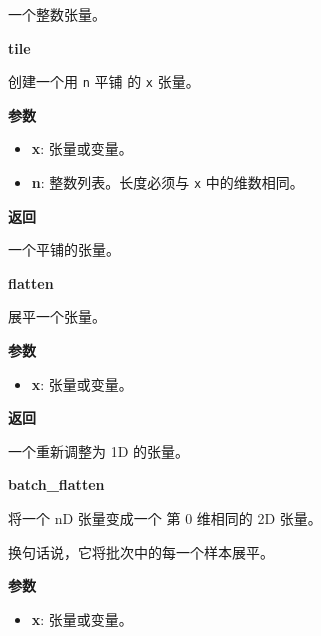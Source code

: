 一个整数张量。


\textbf{tile}\label{tile}

\begin{Shaded}
\begin{Highlighting}[]
\end{Highlighting}
\end{Shaded}

创建一个用 \texttt{n} 平铺 的 \texttt{x} 张量。

\textbf{参数}

\begin{itemize}
\tightlist
\item
  \textbf{x}: 张量或变量。
\item
  \textbf{n}: 整数列表。长度必须与 \texttt{x} 中的维数相同。
\end{itemize}

\textbf{返回}

一个平铺的张量。


\textbf{flatten}\label{flatten}

\begin{Shaded}
\begin{Highlighting}[]
\end{Highlighting}
\end{Shaded}

展平一个张量。

\textbf{参数}

\begin{itemize}
\tightlist
\item
  \textbf{x}: 张量或变量。
\end{itemize}

\textbf{返回}

一个重新调整为 1D 的张量。


\textbf{batch\_flatten}\label{batchux5fflatten}

\begin{Shaded}
\begin{Highlighting}[]
\end{Highlighting}
\end{Shaded}

将一个 nD 张量变成一个 第 0 维相同的 2D 张量。

换句话说，它将批次中的每一个样本展平。

\textbf{参数}

\begin{itemize}
\tightlist
\item
  \textbf{x}: 张量或变量。
\end{itemize}

